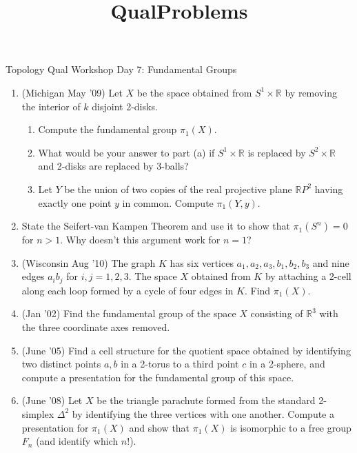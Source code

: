 \documentclass[psamsfonts, 11pt, reqno]{amsart}
\title{QualProblems}
\begin{document}
\begin{center}
\begin{large}
Topology Qual Workshop Day 7: Fundamental Groups
\end{large}
\end{center}
\vspace{.25in}

\begin{enumerate}

\item (Michigan May '09) Let $X$ be the space obtained from $S^1 \times \mathbb{R}$ by removing the interior
of $k$ disjoint 2-disks.
\begin{enumerate}
\item Compute the fundamental group $\pi_1 (X)$.
\item What would be your answer to part (a) if $S^1 \times \mathbb{R}$ is replaced by $S^2 \times \mathbb{R}$ and
2-disks are replaced by 3-balls?
\item Let $Y$ be the union of two copies of the real projective plane $\mathbb{R}P^2$ having exactly one point $y$
in common.  Compute $\pi_1(Y, y)$.
\end{enumerate}

\vfill

\item State the Seifert-van Kampen Theorem and use it to show that $\pi_1 (S^n) = 0$ for $n >1$.  Why doesn't this argument work for $n=1$?

\vfill

\item (Wisconsin Aug '10) The graph $K$ has six vertices $a_1, a_2, a_3, b_1, b_2, b_3$ and nine edges $a_i b_j$ for $i, j = 1,2,3$.  The
space $X$ obtained from $K$ by attaching a 2-cell along each loop formed by a cycle of four edges in $K$.  Find $\pi_1(X)$.


\vfill

\item (Jan '02) Find the fundamental group of the space $X$ consisting of $\mathbb{R}^3$ with the three coordinate axes
removed.

\vfill

\item (June '05) Find a cell structure for the quotient space obtained by identifying two distinct points $a,b$ in
a 2-torus to a third point $c$ in a 2-sphere, and compute a presentation for the fundamental group of this space.

\vfill

\item (June '08) Let $X$ be the triangle parachute formed from the standard 2-simplex $\Delta ^2$ by identifying
the three vertices with one another.  Compute a presentation for $\pi_1(X)$ and show that $\pi_1(X)$ is isomorphic
to a free group $F_n$ (and identify which $n$!).


\end{enumerate}
\end{document}
